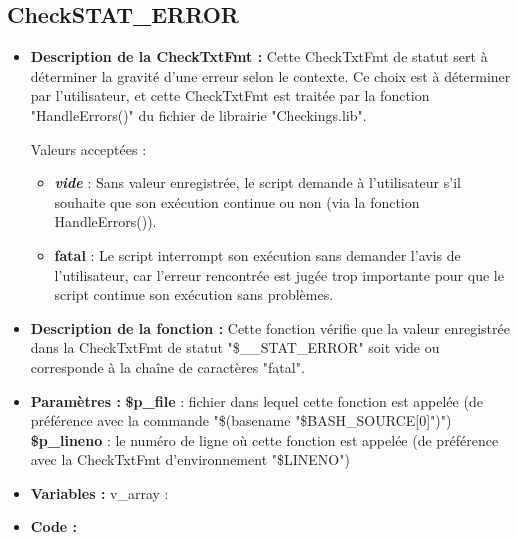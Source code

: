 \documentclass[a4paper,10pt]{article}
\begin{document}
\subsection{CheckSTAT\_ERROR}\color{white}
\begin{itemize}
    \item \textbf{Description de la CheckTxtFmt :} Cette CheckTxtFmt de statut sert à déterminer la gravité d'une erreur selon le contexte. Ce choix est à déterminer par l'utilisateur, et cette CheckTxtFmt est traitée par la fonction "HandleErrors()" du fichier de librairie "Checkings.lib".
    
    Valeurs acceptées :
    \begin{itemize}
        \item \textbf{\textit{vide}} : Sans valeur enregistrée, le script demande à l'utilisateur s'il souhaite que son exécution continue ou non (via la fonction HandleErrors()).
        \item \textbf{fatal} : Le script interrompt son exécution sans demander l'avis de l'utilisateur, car l'erreur rencontrée est jugée trop importante pour que le script continue son exécution sans problèmes.
    \end{itemize}

    \item \textbf{Description de la fonction :} Cette fonction vérifie que la valeur enregistrée dans la CheckTxtFmt de statut "\$\_\_STAT\_ERROR" soit vide ou corresponde à la chaîne de caractères "fatal".

    \item \textbf{Paramètres :}
    \color{orange}\textbf{\$p\_file}\color{white} : fichier dans lequel cette fonction est appelée (de préférence avec la commande "\$(\color{gray}basename \color{white}"\color{orange}\$BASH\_SOURCE[0]\color{white}")")
    \color{orange}\textbf{\$p\_lineno}\color{white} : le numéro de ligne où cette fonction est appelée (de préférence avec la CheckTxtFmt d'environnement "\color{orange}\$LINENO\color{white}")

    \item \textbf{Variables :} v\_array :

    \item \textbf{Code :}
\end{itemize}

\color{green}
\end{document}
